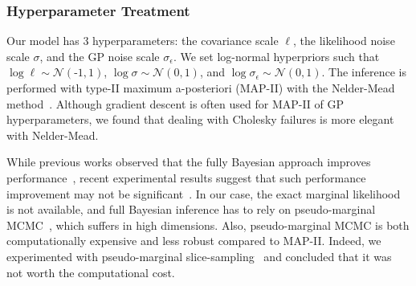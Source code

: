 \vspace{-0.1in}
\subsubsection{Hyperparameter Treatment}
Our model has 3 hyperparameters: the covariance scale \(\ell\), the likelihood noise scale \(\sigma\), and the GP noise scale \(\sigma_\epsilon\).
We set log-normal hyperpriors such that \(\log \ell \sim \mathcal{N}\left(\text{-}1, 1\right)\), \(\log \sigma \sim \mathcal{N}\left(0, 1\right)\), and \(\log \sigma_{\epsilon} \sim \mathcal{N}\left(0, 1\right)\).
The inference is performed with type-II maximum a-posteriori (MAP-II) with the Nelder-Mead method~\cite{nelder_simplex_1965}.
Although gradient descent is often used for MAP-II of GP hyperparameters, we found that dealing with Cholesky failures is more elegant with Nelder-Mead.

While previous works observed that the fully Bayesian approach improves performance~\cite{henrandez-lobato_predictive_2014, snoek_practical_2012}, recent experimental results suggest that such performance improvement may not be significant~\cite{ath_bayesian_2021}.
In our case, the exact marginal likelihood is not available, and full Bayesian inference has to rely on pseudo-marginal MCMC~\cite{filippone_pseudomarginal_2014, pmlr-v51-murray16}, which suffers in high dimensions.
Also, pseudo-marginal MCMC is both computationally expensive and less robust compared to MAP-II.
Indeed, we experimented with pseudo-marginal slice-sampling~\cite{pmlr-v51-murray16} and concluded that it was not worth the computational cost.



